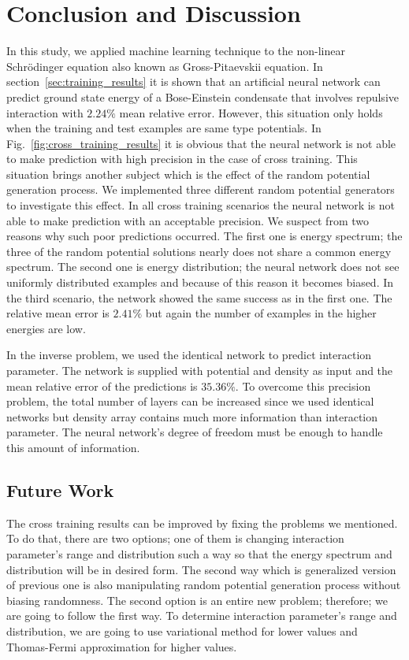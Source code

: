 \documentclass[a4paper,times,hidelinks,12pt]{article}
\begin{document}
\clearpage
\section{Conclusion and Discussion}

In this study, we applied machine learning technique to the non-linear Schr\"{o}dinger equation also known as Gross-Pitaevskii equation. In section~\ref{sec:training_results} it is shown that an artificial neural network can predict ground state energy of a Bose-Einstein condensate that involves repulsive interaction with $2.24\%$ mean relative error. However, this situation only holds when the training and test examples are same type potentials. In Fig.~\ref{fig:cross_training_results} it is obvious that the neural network is not able to make prediction with high precision in the case of cross training. This situation brings another subject which is the effect of the random potential generation process. We implemented three different random potential generators to investigate this effect. In all cross training scenarios the neural network is not able to make prediction with an acceptable precision. We suspect from two reasons why such poor predictions occurred. The first one is energy spectrum; the three of the random potential solutions nearly does not share a common energy spectrum. The second one is energy distribution; the neural network does not see uniformly distributed examples and because of this reason it becomes biased. In the third scenario, the network showed the same success as in the first one. The relative mean error is $2.41\%$ but again the number of examples in the higher energies are low.  

In the inverse problem, we used the identical network to predict interaction parameter. The network is supplied with potential and density as input and the mean relative error of the predictions is $35.36\%$. To overcome this precision problem, the total number of layers can be increased since we used identical networks but density array contains much more information than interaction parameter. The neural network's degree of freedom must be enough to handle this amount of information. 

\subsection{Future Work}

The cross training results can be improved by fixing the problems we mentioned. To do that, there are two options; one of them is changing interaction parameter's range and distribution such a way so that the energy spectrum and distribution will be in desired form. The second way which is generalized version of previous one is also manipulating random potential generation process without biasing randomness. The second option is an entire new problem; therefore; we are going to follow the first way. To determine interaction parameter's range and distribution, we are going to use variational method for lower values and Thomas-Fermi approximation for higher values.
\end{document}
